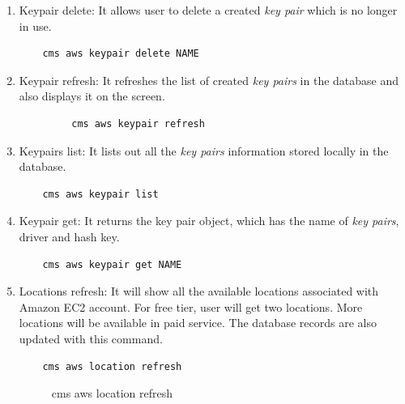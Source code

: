 \documentclass[9pt,twocolumn,twoside]{../../styles/osajnl}
\begin{document}
\begin{enumerate}
    \item Keypair delete: It allows user to delete a created \textit{key pair} which is no longer in use.
    
    \begin{verbatim}
    cms aws keypair delete NAME
    \end{verbatim}
    
    \item Keypair refresh: It refreshes the list of created \textit{key pairs} in the database and also displays it on the screen.
    
    \begin{verbatim}
	     cms aws keypair refresh
    \end{verbatim}
    
    \item Keypairs list: It lists out all the \textit{key pairs} information stored locally in the database.
           
    \begin{verbatim}
    cms aws keypair list
    \end{verbatim}
    
    \item Keypair get: It returns the key pair object, which has the name of \textit{key pairs}, driver and hash key.
    
    \begin{verbatim}
    cms aws keypair get NAME
    \end{verbatim}
    
    
    \item Locations refresh: It will show all the available locations associated with Amazon EC2 account. For free tier, user will get two locations. More locations will be available in paid service. The database records are also updated with this command.
    
    \begin{verbatim}
    cms aws location refresh
    \end{verbatim}
    
    \begin{figure}[h!]
    	\centering
    	\caption{cms aws location refresh}
    	\label{fig:locationlist}
    \end{figure}



\end{enumerate}
\end{document}
